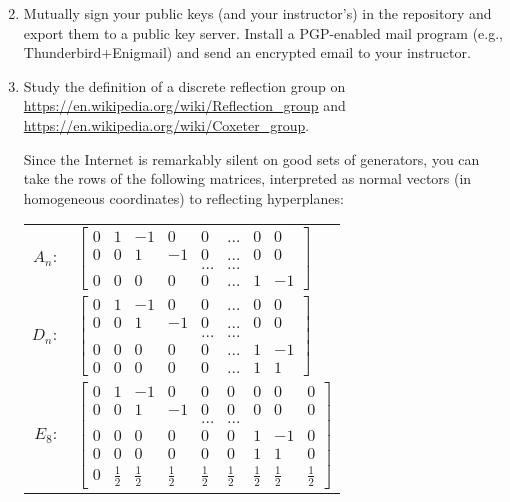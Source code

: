 \documentclass[11pt]{amsart}
\begin{document}
\begin{enumerate}
\setcounter{enumi}{1}
\setlength{\itemsep}{2ex}

\item Mutually sign your public keys (and your instructor's) in the repository and export them to a public key server. Install a PGP-enabled mail program (e.g., Thunderbird+Enigmail) and send an encrypted email to your instructor.

\item Study the definition of a discrete reflection group on \url{https://en.wikipedia.org/wiki/Reflection_group} and \url{https://en.wikipedia.org/wiki/Coxeter_group}. 

Since the Internet is remarkably silent on good sets of generators, you can take the rows of the following matrices, interpreted as normal vectors (in homogeneous coordinates) to reflecting hyperplanes:

\begin{multicols}{2}
  \begin{tabular}[c]{rl}
    $A_n:$ 
    &\small 
    $\begin{bmatrix}
     0 & 1 & -1 & 0 & 0 & \dots & 0 & 0 \\
     0 & 0 & 1 & -1 & 0 & \dots & 0 & 0 \\
     &&&&\dots&\dots \\
     0 & 0 & 0 & 0 & 0 & \dots & 1 & -1 
    \end{bmatrix}$
    \\[6ex]
    $D_n:$      
    &\small
    $\begin{bmatrix}
     0 & 1 & -1 & 0 & 0 & \dots & 0 & 0 \\
     0 & 0 & 1 & -1 & 0 & \dots & 0 & 0 \\
     &&&&\dots&\dots\\
     0 & 0 & 0 & 0 & 0 & \dots & 1 & -1 \\
     0 & 0 & 0 & 0 & 0 & \dots & 1 & 1   
    \end{bmatrix}$
    \\[8ex]
    $E_8:$
    &\small 
    $\begin{bmatrix}
     0 & 1 & -1 & 0 & 0 & 0 & 0 & 0 & 0 \\
     0 & 0 & 1 & -1 & 0 & 0 & 0 & 0 & 0 \\
     &&&&\dots&\dots\\
     0 & 0 & 0 & 0 & 0 & 0 & 1 & -1 & 0 \\
     0 & 0 & 0 & 0 & 0 & 0 & 1 & 1 & 0 \\
     0 & \frac12 & \frac12 & \frac12 & \frac12 & \frac12 & \frac12 & \frac12 & \frac12  
    \end{bmatrix}$
  \end{tabular}


\end{multicols}
\end{enumerate}
\end{document}
